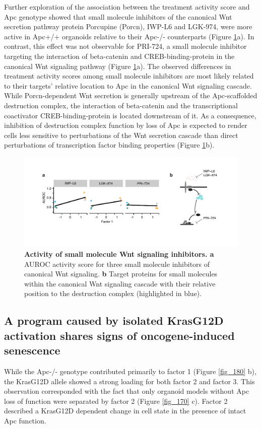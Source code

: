 \begin{flushleft}
Further exploration of the association between the treatment activity score and Apc genotype showed that small molecule inhibitors of the canonical Wnt secretion pathway protein Porcupine (Porcn), IWP-L6 and LGK-974, were more active in Apc+/+ organoids relative to their Apc-/- counterparts \citep{Liu2013-dh} (Figure \ref{fig_199}a). In contrast, this effect was not observable for PRI-724, a small molecule inhibitor targeting the interaction of beta-catenin and CREB-binding-protein in the canonical Wnt signaling pathway \citep{Okazaki2019-gy} (Figure \ref{fig_199}a). The observed differences in treatment activity scores among small molecule inhibitors are most likely related to their targets' relative location to Apc in the canonical Wnt signaling cascade. While Porcn-dependent Wnt secretion is generally upstream of the Apc-scaffolded destruction complex, the interaction of beta-catenin and the transcriptional coactivator CREB-binding-protein is located downstream of it. As a consequence, inhibition of destruction complex function by loss of Apc is expected to render cells less sensitive to perturbations of the Wnt secretion cascade than direct perturbations of transcription factor binding properties (Figure \ref{fig_199}b).

\begin{figure}[h!]
\centering
\includegraphics[scale=0.75,keepaspectratio]{figures/adenomaprofiling/pdf/fig_2_2_1.pdf}
\caption[Activity of small molecule Wnt signaling inhibitors]{\textbf{Activity of small molecule Wnt signaling inhibitors. a} AUROC activity score for three small molecule inhibitors of canonical Wnt signaling. \textbf{b} Target proteins for small molecules within the canonical Wnt signaling cascade with their relative position to the destruction complex (highlighted in blue).}
\label{fig_199}
\end{figure}
\bigbreak

\newpage

\subsection{A program caused by isolated KrasG12D activation shares signs of oncogene-induced senescence}
While the Apc-/- genotype contributed primarily to factor 1 (Figure \ref{fig_180} b), the KrasG12D allele showed a strong loading for both factor 2 and factor 3. This observation corresponded with the fact that only organoid models without Apc loss of function were separated by factor 2 (Figure \ref{fig_170} c). Factor 2 described a KrasG12D dependent change in cell state in the presence of intact Apc function.



\end{flushleft}
